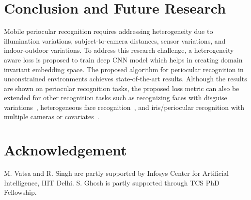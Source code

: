 \documentclass[10pt,twocolumn,letterpaper]{article}
\begin{document}
\section{Conclusion and Future Research}
\vspace{-4pt}
Mobile periocular recognition requires addressing heterogeneity due to illumination variations, subject-to-camera distances, sensor variations, and indoor-outdoor variations. To address this research challenge, a heterogeneity aware loss is proposed to train deep CNN model which helps in creating domain invariant embedding space. The proposed algorithm for periocular recognition in unconstrained environments achieves state-of-the-art results. Although the results are shown on periocular recognition tasks, the proposed loss metric can also be extended for other recognition tasks such as recognizing faces with disguise variations~\cite{dhamecha2014recognizing,kushwaha2018disguised,singh2009face}, heterogeneous face recognition~\cite{dhamecha2014effectiveness,ghosh2015feature}, and iris/periocular recognition with multiple cameras or covariates~\cite{arora2012iris,keshari2016mobile}. 
\vspace{-8pt}
\section{Acknowledgement}
\vspace{-4pt}
M. Vatsa and R. Singh are partly supported by Infosys Center for Artificial Intelligence, IIIT Delhi. S. Ghosh is partly supported through TCS PhD Fellowship.

{\small


}
\end{document}

